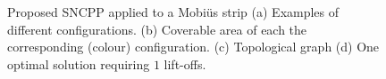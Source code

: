 \documentclass[Afour,sageh,times]{sagej}
\begin{document}
\begin{figure}[t]
\centering
{}
\caption{Proposed SNCPP applied to a Mobi\"{u}s strip (a) Examples of different configurations. 
(b) Coverable area of each the corresponding (colour) configuration. 
(c) Topological graph (d) One optimal solution requiring $1$ lift-offs. }
\label{fig_mobius_exp}
\end{figure}
\end{document}
